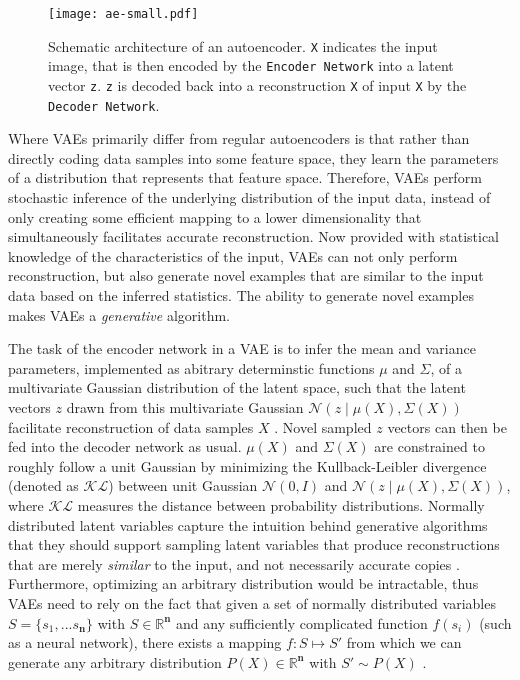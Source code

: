 \documentclass[twocolumn]{article}
\begin{document}
\begin{figure}
\centering
\texttt{[image: ae-small.pdf]}
\caption{Schematic architecture of an autoencoder. \texttt{X} indicates the input image, that is then encoded by the \texttt{Encoder Network} into a latent vector \texttt{z}. \texttt{z} is decoded back into a reconstruction \texttt{X\textquotesingle} of input \texttt{X} by the \texttt{Decoder Network}.}
\label{fig:ae}
\end{figure}

Where VAEs primarily differ from regular autoencoders is that rather
than directly coding data samples into some feature space, they learn
the parameters of a distribution that represents that feature space.
Therefore, VAEs perform stochastic inference of the underlying
distribution of the input data, instead of only creating some efficient
mapping to a lower dimensionality that simultaneously facilitates
accurate reconstruction. Now provided with statistical knowledge of the
characteristics of the input, VAEs can not only perform reconstruction,
but also generate novel examples that are similar to the input data
based on the inferred statistics. The ability to generate novel examples
makes VAEs a \emph{generative} algorithm.

The task of the encoder network in a VAE is to infer the mean and
variance parameters, implemented as abitrary determinstic functions $\mu$ and $\Sigma$, of a multivariate Gaussian distribution of the latent space, such that the latent vectors
\(z\) drawn from this multivariate Gaussian \(\mathcal{N}(z \mathbin{\vert} \mu(X), \Sigma(X))\) facilitate reconstruction of data samples \(X\)
\citep{doersch2016tutorial}. Novel sampled \(z\) vectors can then be fed
into the decoder network as usual. \(\mu(X)\) and \(\Sigma(X)\) are
constrained to roughly follow a unit Gaussian by minimizing the
Kullback-Leibler divergence (denoted as \(\mathcal{KL}\)) between unit Gaussian
\(\mathcal{N}(0, I)\) and
\(\mathcal{N}(z \mathbin{\vert} \mu(X), \Sigma(X))\), where
\(\mathcal{KL}\) measures the distance between probability
distributions. Normally distributed latent variables capture the
intuition behind generative algorithms that they should support sampling
latent variables that produce reconstructions that are merely
\emph{similar} to the input, and not necessarily accurate copies \citep{doersch2016tutorial}.
Furthermore, optimizing an arbitrary distribution would be intractable,
thus VAEs need to rely on the fact that given a set of normally
distributed variables \(S = \{s_1, ... s_\mathbf{n}\}\) with
\(S \in \mathbb{R}^{\mathbf{n}}\) and any sufficiently complicated
function \(f(s_i)\) (such as a neural network), there exists a mapping
\(f: S \mapsto S'\) from which we can generate any arbitrary
distribution \(P(X) \in \mathbb{R}^{\mathbf{n}}\) with \(S' \sim P(X)\)
\citep{doersch2016tutorial}. \\
\end{document}
